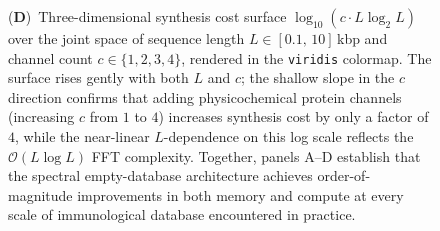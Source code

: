 \begin{figure}[!htbp]
{    (\textbf{D})~Three-dimensional synthesis cost surface $\log_{10}(c\cdot L\log_2 L)$ over the joint space of sequence length $L\in[0.1,\,10]$\,kbp and channel count $c\in\{1,2,3,4\}$, rendered in the \texttt{viridis} colormap.
    The surface rises gently with both $L$ and $c$; the shallow slope in the $c$ direction confirms that adding physicochemical protein channels (increasing $c$ from $1$ to $4$) increases synthesis cost by only a factor of $4$, while the near-linear $L$-dependence on this log scale reflects the $\mathcal{O}(L\log L)$ FFT complexity.
    Together, panels A--D establish that the spectral empty-database architecture achieves order-of-magnitude improvements in both memory and compute at every scale of immunological database encountered in practice.}
    \label{fig:immuno_panel6}
\end{figure}
